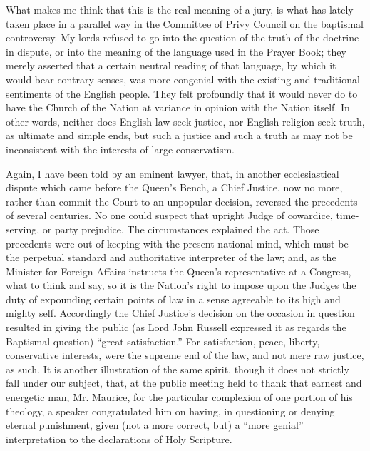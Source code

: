 What makes me think that this is the real meaning
of a jury, is what has lately taken place in a parallel way in the
Committee of Privy Council on the baptismal controversy. My lords
refused to go into the question of the truth of the doctrine in
dispute, or into the meaning of the language used in the Prayer Book;
they merely asserted that a certain neutral reading of that language,
by which it would bear contrary senses, was more congenial with the
existing and traditional sentiments of the English people. They felt
profoundly that it would never do to have the Church of the Nation at
variance in opinion with the Nation itself. In other words, neither
does English law seek justice, nor English religion seek truth, as
ultimate and simple ends, but such a justice and such a truth as may
not be inconsistent with the interests of large conservatism.

Again, I have been told by an eminent lawyer,
that, in another ecclesiastical dispute which came before the Queen's
Bench, a Chief Justice, now no more, rather than commit the Court to
an unpopular decision, reversed the precedents of several centuries.
No one could suspect that upright Judge of cowardice, time-serving, or
party prejudice. The circumstances explained the act. Those precedents
were out of keeping with the present national mind, which must be the
perpetual standard and authoritative interpreter of the law; and, as
the Minister for Foreign Affairs instructs the Queen's representative
at a Congress, what to think and say, so it is the Nation's right to
impose upon the Judges the duty of expounding certain points of law in
a sense agreeable to its high and mighty self. Accordingly the
Chief Justice's decision on the occasion in question resulted in
giving the public (as Lord John Russell expressed it as regards the
Baptismal question) ``great satisfaction.'' For satisfaction, peace,
liberty, conservative interests, were the supreme end of the law, and
not mere raw justice, as such. It is another illustration of the same
spirit, though it does not strictly fall under our subject, that, at
the public meeting held to thank that earnest and energetic man, Mr.
Maurice, for the particular complexion of one portion of his theology,
a speaker congratulated him on having, in questioning or denying
eternal punishment, given (not a more correct, but) a ``more genial''
interpretation to the declarations of Holy Scripture.

